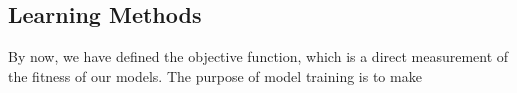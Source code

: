 \subsection {Learning Methods}
By now, we have defined the objective function, which is a direct measurement of the fitness of our models. The purpose of model training is to make